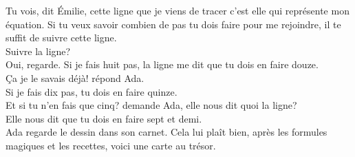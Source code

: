 \guillemotleft Tu vois, dit Émilie, cette ligne que je viens de tracer c’est elle qui représente mon équation. Si tu veux savoir combien de pas tu dois faire pour me rejoindre, il te suffit de suivre cette ligne.\\
\mdash Suivre la ligne?\\
\mdash Oui, regarde. Si je fais huit pas, la ligne me dit que tu dois en faire douze.\\
\mdash Ça je le savais déjà! répond Ada.\\
\mdash Si je fais dix pas, tu dois en faire quinze.\\ 
\mdash Et si tu n’en fais que cinq? demande Ada, elle nous dit quoi la ligne?\\
\mdash Elle nous dit que tu dois en faire sept et demi.\guillemotright\\
Ada regarde le dessin dans son carnet. Cela lui plaît bien, après les formules magiques et les recettes, voici une carte au trésor.
